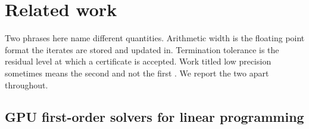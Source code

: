 %
%
%

\section{Related work}

Two phrases here name different quantities. Arithmetic width is the floating
point format the iterates are stored and updated in. Termination tolerance is
the residual level at which a certificate is accepted. Work titled low precision
sometimes means the second and not the first \citep{KempkeKoch2025}. We report
the two apart throughout.

\subsection{GPU first-order solvers for linear programming}

